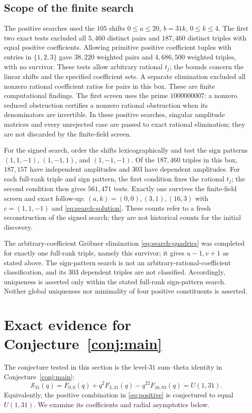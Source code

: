 \documentclass[11pt,reqno]{amsart}
\newcommand{\Ssum}{\mathcal S_{31}}
\theoremstyle{remark}
\numberwithin{equation}{section}
\begin{document}
\subsection{Scope of the finite search}
The positive searches used the $105$ shifts
$0\leq a\leq20$, $b=31k$, $0\leq k\leq4$.
The first two exact tests excluded all $5,460$ distinct pairs and
$187,460$ distinct triples with equal positive coefficients.
Allowing primitive positive coefficient tuples with entries in
$\{1,2,3\}$ gave $38,220$ weighted pairs and $4,686,500$ weighted
triples, with no survivor. These tests allow arbitrary rational $t_j$;
the bounds concern the linear shifts and the specified coefficient sets.
A separate elimination excluded all nonzero rational coefficient ratios
for pairs in this box. These are finite computational findings.
The first screen uses the prime $1000000007$:
a nonzero reduced obstruction certifies a nonzero rational obstruction
when its denominators are invertible. In these positive searches,
singular amplitude matrices and every unrejected case are passed to
exact rational elimination; they
are not discarded by the finite-field screen.

For the signed search, order the
shifts lexicographically and test the sign patterns $(1,1,-1)$,
$(1,-1,1)$, and $(1,-1,-1)$. Of the $187,460$ triples in this box,
$187,157$ have independent amplitudes and $303$ have dependent
amplitudes. For each full-rank triple and sign pattern, the first
condition fixes the rational $t_j$; the second condition then gives
$561,471$ tests. Exactly one survives the finite-field screen and
exact follow-up: $(a,k)=(0,0),(3,1),(16,3)$ with $c=(1,1,-1)$ and
\eqref{eq:search-solution}. These counts refer to a fresh reconstruction of the signed search;
they are not historical counts for the initial discovery.

The arbitrary-coefficient Gr\"obner elimination
\eqref{eq:search-quadrics} was completed for exactly one full-rank
triple, namely this survivor; it gives $u-1,v+1$ as stated above.
The sign-pattern search is not an arbitrary-rational-coefficient
classification, and its $303$ dependent triples are not classified.
Accordingly, uniqueness is asserted only within the stated full-rank
sign-pattern search. Neither global uniqueness nor minimality of four
positive constituents is asserted.

\section{Exact evidence for Conjecture~\ref{conj:main}}\label{sec:evidence}
The conjecture tested in this section is the level-$31$ sum--theta
identity in Conjecture~\ref{conj:main}:
\[
 \Ssum(q)=F_{0,0}(q)+q^2F_{3,31}(q)-q^{22}F_{16,93}(q)=U(1,31).
\]
Equivalently, the positive combination in \eqref{eq:positive} is
conjectured to equal $U(1,31)$. We examine its coefficients and radial
asymptotics below.
\end{document}
